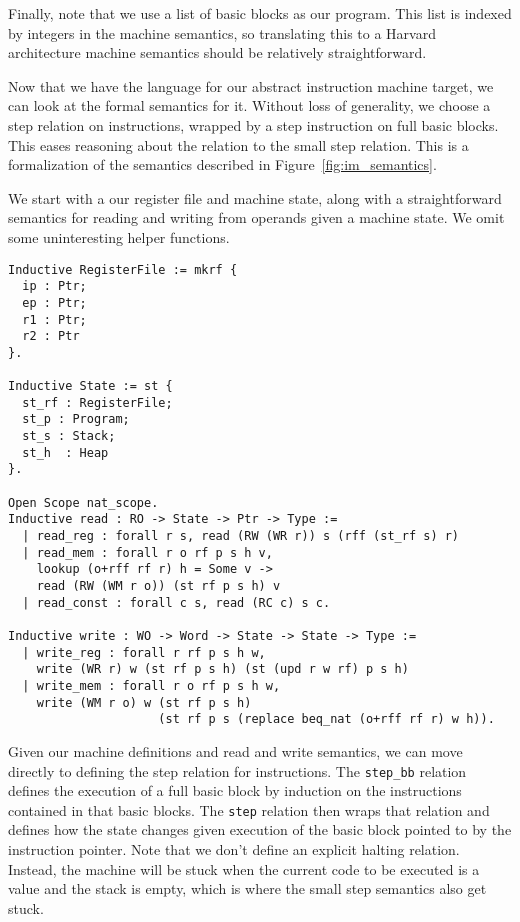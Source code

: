 Finally, note that we use a list of basic blocks as our program. This list is
indexed by integers in the machine semantics, so translating this to a Harvard 
architecture machine semantics should be relatively straightforward. 

Now that we have the language for our abstract instruction machine target, we
can look at the formal semantics for it. Without loss of generality, we choose a
step relation on instructions, wrapped by a step instruction on full basic
blocks. This eases reasoning about the relation to the small step \ce
relation. This is a formalization of the semantics described in
Figure~\ref{fig:im_semantics}. 

We start with a our register file and machine state, along with a
straightforward semantics for reading and writing from operands given a 
machine state. We omit some uninteresting helper functions. 

\begin{verbatim}
Inductive RegisterFile := mkrf {
  ip : Ptr;
  ep : Ptr;
  r1 : Ptr; 
  r2 : Ptr
}. 

Inductive State := st {
  st_rf : RegisterFile;
  st_p : Program;
  st_s : Stack;
  st_h  : Heap
}.

Open Scope nat_scope. 
Inductive read : RO -> State -> Ptr -> Type :=
  | read_reg : forall r s, read (RW (WR r)) s (rff (st_rf s) r)
  | read_mem : forall r o rf p s h v, 
    lookup (o+rff rf r) h = Some v ->
    read (RW (WM r o)) (st rf p s h) v
  | read_const : forall c s, read (RC c) s c.

Inductive write : WO -> Word -> State -> State -> Type :=
  | write_reg : forall r rf p s h w, 
    write (WR r) w (st rf p s h) (st (upd r w rf) p s h)
  | write_mem : forall r o rf p s h w, 
    write (WM r o) w (st rf p s h) 
                     (st rf p s (replace beq_nat (o+rff rf r) w h)).
\end{verbatim}

Given our machine definitions and read and write semantics, we can move directly
to defining the step relation for instructions. The \texttt{step\_bb} relation
defines the execution of a full basic block by induction on the instructions
contained in that basic blocks. The \texttt{step} relation then wraps that
relation and defines how the state changes given execution of the basic block
pointed to by the instruction pointer. Note that we don't define an explicit
halting relation. Instead, the machine will be stuck when the current code to be
executed is a value and the stack is empty, which is where the small step
\ce semantics also get stuck. 

